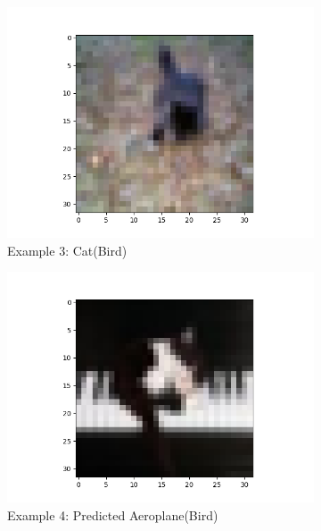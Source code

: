 \documentclass[11pt]{article}
\begin{document}
\begin{figure}[H]
\begin{subfigure}[b]{0.3\textwidth}
        \includegraphics[width=\linewidth]{misA3.png}
        \caption{Example 3: Cat(Bird)}
    \end{subfigure} 
    \medskip
    \begin{subfigure}[b]{0.3\textwidth}
        \centering
        \includegraphics[width=\linewidth]{misA4.png}
        \caption{Example 4: Predicted Aeroplane(Bird)}
    \end{subfigure}
    \begin{subfigure}[b]{0.3\textwidth}
        \centering

\end{subfigure}
\end{figure}
\end{document}
